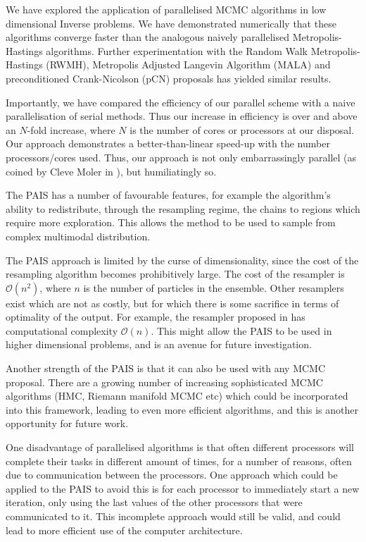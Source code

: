 \documentclass[final]{siamltex}
\begin{document}
We have explored the application of parallelised MCMC algorithms in
low dimensional Inverse problems. We have demonstrated numerically
that these algorithms converge faster than the analogous naively parallelised
Metropolis-Hastings algorithms. Further experimentation with the
Random Walk Metropolis-Hastings (RWMH), Metropolis Adjusted Langevin
Algorithm (MALA) and preconditioned Crank-Nicolson (pCN) proposals has
yielded similar results\cite{Paul}.%

Importantly, we have compared the efficiency of our parallel scheme
with a naive parallelisation of serial methods. Thus our increase in
efficiency is over and above an $N$-fold increase, where $N$ is the
number of cores or processors at our disposal. Our approach
demonstrates a better-than-linear speed-up with the number
processors/cores used. Thus, our approach is not only embarrassingly
parallel (as coined by Cleve Moler in \cite{moler1986matrix}), but
humiliatingly so.

The PAIS has a number of favourable features, for example the
algorithm's ability to redistribute, through the resampling regime,
the chains to regions which require more exploration. This allows the
method to be used to sample from complex multimodal distribution.

The PAIS approach is limited by the curse of dimensionality, since the
cost of the resampling algorithm becomes prohibitively large. The cost
of the resampler is $\mathcal{O}(n^2)$, where $n$ is the number of
particles in the ensemble. Other resamplers exist which are not as
costly, but for which there is some sacrifice in terms of optimality
of the output. For example, the resampler proposed in
\cite{schefzik2013uncertainty}  has computational complexity
$\mathcal{O}(n)$. This might allow the PAIS to be used in higher
dimensional problems, and is an avenue for future investigation.

Another strength of the PAIS is that it can also be used with any MCMC
proposal. There are a growing number of increasing sophisticated MCMC
algorithms (HMC, Riemann manifold MCMC etc) which could be incorporated into this framework, leading to
even more efficient algorithms, and this is another opportunity for
future work.

One disadvantage of parallelised algorithms is that often different
processors will complete their tasks in different amount of times, for
a number of reasons, often due to communication between the
processors. One approach which could be applied to the PAIS to avoid
this is for each processor to immediately start a new iteration, only
using the last values of the other processors that were communicated
to it. This incomplete approach would still be valid, and could lead
to more efficient use of the computer architecture.
\end{document}
